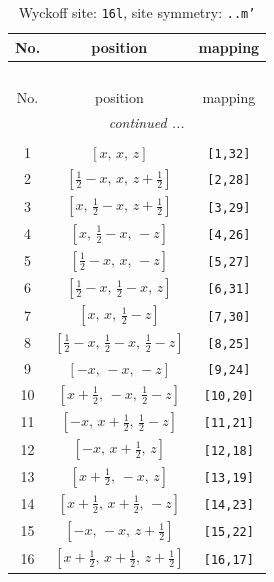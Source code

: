 \documentclass[fleqn,8pt]{jsarticle}
\begin{document}
\renewcommand{\arraystretch}{1.2}
\begin{longtable}{ccc}
\caption{Wyckoff site: {\tt 16l}, site symmetry: {\tt ..m'}}
 \\
 \hline \hline
No. & position & mapping \\ \hline \endfirsthead

\multicolumn{2}{l}{\tablename\ \thetable{}} \\
 \hline \hline
No. & position & mapping \\ \hline \endhead

 \hline \hline
\multicolumn{2}{r}{\footnotesize\it continued ...} \\ \endfoot

 \hline \hline
\multicolumn{2}{r}{} \\ \endlastfoot

1 & $\left[ x,\, x,\, z \right]$ & {\tt [1,32]} \\ \hline
2 & $\left[ \frac{1}{2} - x,\, x,\, z + \frac{1}{2} \right]$ & {\tt [2,28]} \\ \hline
3 & $\left[ x,\, \frac{1}{2} - x,\, z + \frac{1}{2} \right]$ & {\tt [3,29]} \\ \hline
4 & $\left[ x,\, \frac{1}{2} - x,\, - z \right]$ & {\tt [4,26]} \\ \hline
5 & $\left[ \frac{1}{2} - x,\, x,\, - z \right]$ & {\tt [5,27]} \\ \hline
6 & $\left[ \frac{1}{2} - x,\, \frac{1}{2} - x,\, z \right]$ & {\tt [6,31]} \\ \hline
7 & $\left[ x,\, x,\, \frac{1}{2} - z \right]$ & {\tt [7,30]} \\ \hline
8 & $\left[ \frac{1}{2} - x,\, \frac{1}{2} - x,\, \frac{1}{2} - z \right]$ & {\tt [8,25]} \\ \hline
9 & $\left[ - x,\, - x,\, - z \right]$ & {\tt [9,24]} \\ \hline
10 & $\left[ x + \frac{1}{2},\, - x,\, \frac{1}{2} - z \right]$ & {\tt [10,20]} \\ \hline
11 & $\left[ - x,\, x + \frac{1}{2},\, \frac{1}{2} - z \right]$ & {\tt [11,21]} \\ \hline
12 & $\left[ - x,\, x + \frac{1}{2},\, z \right]$ & {\tt [12,18]} \\ \hline
13 & $\left[ x + \frac{1}{2},\, - x,\, z \right]$ & {\tt [13,19]} \\ \hline
14 & $\left[ x + \frac{1}{2},\, x + \frac{1}{2},\, - z \right]$ & {\tt [14,23]} \\ \hline
15 & $\left[ - x,\, - x,\, z + \frac{1}{2} \right]$ & {\tt [15,22]} \\ \hline
16 & $\left[ x + \frac{1}{2},\, x + \frac{1}{2},\, z + \frac{1}{2} \right]$ & {\tt [16,17]} \\
\end{longtable}
\end{document}
